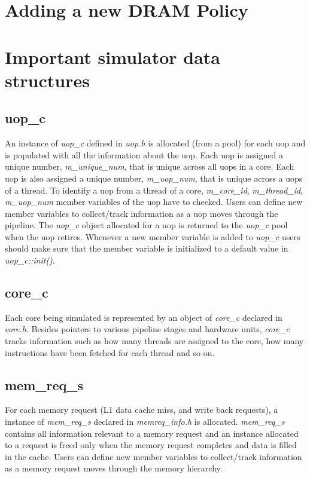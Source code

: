 \section{Adding a new DRAM Policy}


\section{Important simulator data structures}

\subsection{uop\_c}

An instance of \textit{uop\_c} defined in \textit{uop.h} is allocated (from a
    pool) for each uop and is populated with all the information about the uop.
Each uop is assigned a unique number, \textit{m\_unique\_num}, that is unique
across all uops in a core. Each uop is also assigned a unique number,
       \textit{m\_uop\_num}, that is unique across a uops of a thread. To
       identify a uop from a thread of a core, \textit{m\_core\_id},
       \textit{m\_thread\_id}, \textit{m\_uop\_num} member variables of the uop
       have to checked. Users can define new member variables to collect/track
       information as a uop moves through the pipeline. The \textit{uop\_c}
       object allocated for a uop is returned to the \textit{uop\_c} pool when
       the uop retires.  Whenever a new member variable is added to
       \textit{uop\_c} users should make sure that the member variable is
       initialized to a default value in \textit{uop\_c::init()}.

\subsection{core\_c}

Each core being simulated is represented by an object of \textit{core\_c}
declared in \textit{core.h}. Besides pointers to various pipeline stages and
hardware units, \textit{core\_c} tracks information such as how many threads
are assigned to the core, how many instructions have been fetched for each
thread and so on.


\subsection{mem\_req\_s}

For each memory request (L1 data cache miss, and write back requests), a
instance of \textit{mem\_req\_s} declared in \textit{memreq\_info.h} is
allocated. \textit{mem\_req\_s} contains all information relevant to a memory
request and an instance allocated to a request is freed only when the memory
request completes and data is filled in the cache. Users can define new member
variables to collect/track information as a memory request moves through the
memory hierarchy.


